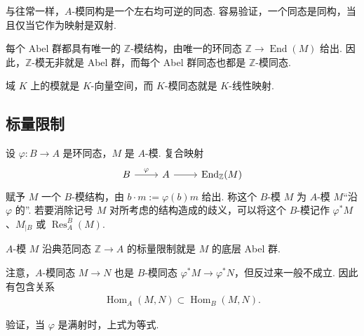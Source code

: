 与往常一样，$A$-模同构是一个左右均可逆的同态. 容易验证，一个同态是同构，当且仅当它作为映射是双射.
\begin{example*}[{$A=\mathbb Z$}]
每个 Abel 群都具有唯一的 $\mathbb Z$-模结构，由唯一的环同态 $\mathbb Z\longrightarrow\operatorname{End}(M)$ 给出. 因此，$\mathbb Z$-模无非就是 Abel 群，而每个 Abel 群同态也都是 $\mathbb Z$-模同态.
\end{example*}
\begin{example*}[{$A$ 是域}]
域 $K$ 上的模就是 $K$-向量空间，而 $K$-模同态就是 $K$-线性映射.
\end{example*}

\subsection{标量限制}\label{sec:galois-1-3-2}
设 $\varphi\colon B\longrightarrow A$ 是环同态，$M$ 是 $A$-模. 复合映射
\[
\begin{tikzcd}
 B\arrow[r,"\varphi"] & A\arrow[r] & \operatorname{End}_{\mathbb Z}(M)
\end{tikzcd}
\]
赋予 $M$ 一个 $B$-模结构，由 $b\cdot m:=\varphi(b)m$ 给出. 称这个 $B$-模 $M$ 为 $A$-模 $M$``沿 $\varphi$ 的''. 若要消除记号 $M$ 对所考虑的结构造成的歧义，可以将这个 $B$-模记作 $\varphi^*M$、$M_{|B}$ 或 $\operatorname{Res}_A^B(M)$.
\begin{example*}
$A$-模 $M$ 沿典范同态 $\mathbb Z\longrightarrow A$ 的标量限制就是 $M$ 的底层 Abel 群.
\end{example*}
注意，$A$-模同态 $M\longrightarrow N$ 也是 $B$-模同态 $\varphi^*M\longrightarrow\varphi^*N$，但反过来一般不成立. 因此有包含关系
\begin{align*}
 \operatorname{Hom}_A(M,N)\subset\operatorname{Hom}_B(M,N).
\end{align*}
\begin{exercise*}
验证，当 $\varphi$ 是满射时，上式为等式.
\end{exercise*}

